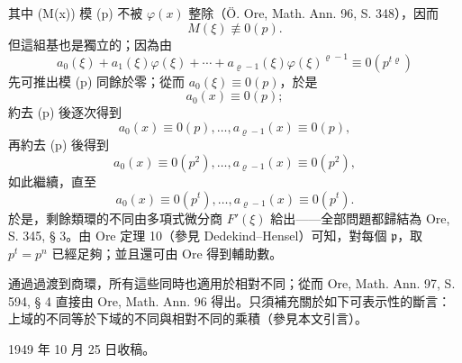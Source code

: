 \documentclass[11pt]{article}
\begin{document}
其中 (M(x)) 模 (p) 不被 \(\varphi(x)\) 整除（Ö. Ore, Math. Ann. 96, S. 348），因而
\[
M(\xi)\not\equiv0(p).
\]
但這組基也是獨立的；因為由
\[
a_0(\xi)+a_1(\xi)\varphi(\xi)+\cdots+a_{\varrho-1}(\xi)\varphi(\xi)^{\varrho-1}
\equiv0(p^{t\varrho})
\]
先可推出模 (p) 同餘於零；從而 \(a_0(\xi)\equiv0(p)\)，於是
\[
a_0(x)\equiv0(p);
\]
約去 (p) 後逐次得到
\[
a_0(x)\equiv0(p),\ldots,a_{\varrho-1}(x)\equiv0(p),
\]
再約去 (p) 後得到
\[
a_0(x)\equiv0(p^2),\ldots,a_{\varrho-1}(x)\equiv0(p^2),
\]
如此繼續，直至
\[
a_0(x)\equiv0(p^t),\ldots,a_{\varrho-1}(x)\equiv0(p^t).
\]
於是，剩餘類環的不同由多項式微分商 \(F'(\xi)\) 給出——全部問題都歸結為 Ore, S. 345, § 3。由 Ore 定理 10（參見 Dedekind--Hensel）可知，對每個 \(\mathfrak p\)，取 \(p^t=p^n\) 已經足夠；並且還可由 Ore 得到輔助數。

通過過渡到商環，所有這些同時也適用於相對不同；從而 Ore, Math. Ann. 97, S. 594, § 4 直接由 Ore, Math. Ann. 96 得出。只須補充關於如下可表示性的斷言：上域的不同等於下域的不同與相對不同的乘積（參見本文引言）。

\begin{center}
1949 年 10 月 25 日收稿。
\end{center}
\end{document}
